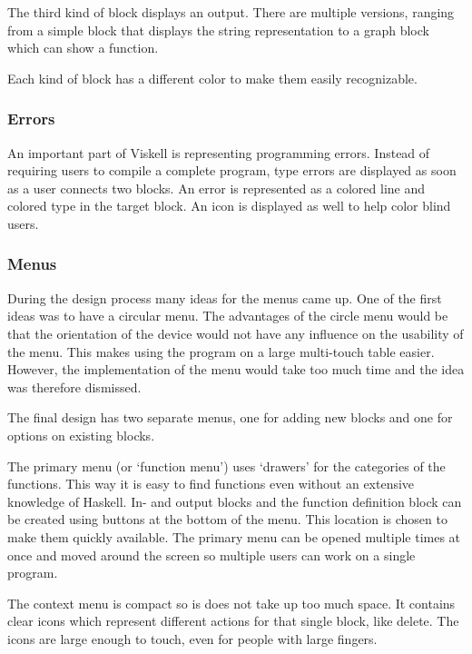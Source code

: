 The third kind of block displays an output. 
There are multiple versions, ranging from a simple block that displays the string representation to a graph block which can show a function. 

Each kind of block has a different color to make them easily recognizable.

\subsubsection{Errors}

An important part of Viskell is representing programming errors.
Instead of requiring users to compile a complete program, type errors are displayed as soon as a user connects two blocks.
An error is represented as a colored line and colored type in the target block.
An icon is displayed as well to help color blind users.

\subsubsection{Menus}

During the design process many ideas for the menus came up.
One of the first ideas was to have a circular menu. \label{circular_menu} 
The advantages of the circle menu would be that the orientation of the device would not have any influence on the usability of the menu.
This makes using the program on a large multi-touch table easier.
However, the implementation of the menu would take too much time and the idea was therefore dismissed.

The final design has two separate menus, one for adding new blocks and one for options on existing blocks.

The primary menu (or `function menu') uses `drawers' for the categories of the functions.  
This way it is easy to find functions even without an extensive knowledge of Haskell.
In- and output blocks and the function definition block can be created using buttons at the bottom of the menu.
This location is chosen to make them quickly available.
The primary menu can be opened multiple times at once and moved around the screen so multiple users can work on a single program.

The context menu is compact so is does not take up too much space. 
It contains clear icons which represent different actions for that single block, like delete.
The icons are large enough to touch, even for people with large fingers.


